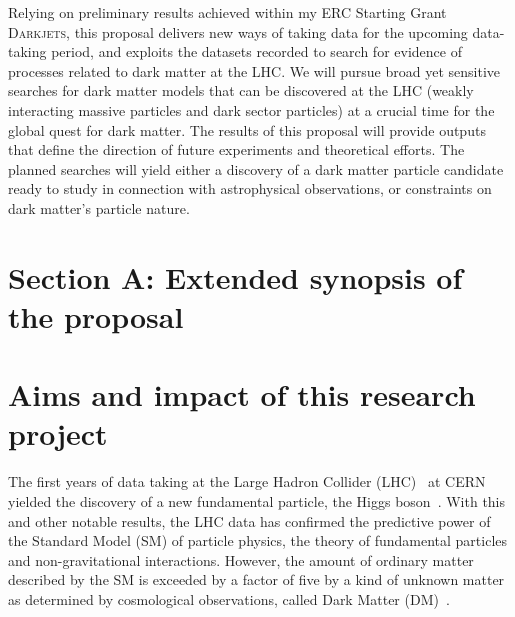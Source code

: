 \documentclass[11pt,a4paper]{article}
\begin{document}
Relying on preliminary results achieved within my ERC Starting Grant \textsc{Darkjets}, this proposal delivers new ways of taking data for the upcoming data-taking period, and exploits the datasets recorded to search for evidence of processes related to dark matter at the LHC. 
We will pursue broad yet sensitive searches for dark matter models that can be discovered at the LHC (weakly interacting massive particles and dark sector particles) at a crucial time for the global quest for dark matter. 
The results of this proposal will provide outputs that define the direction of future experiments and theoretical efforts. The planned searches will yield either a discovery of a dark matter particle candidate ready to study in connection with astrophysical observations, or constraints on dark matter’s particle nature. 

\clearpage

\section*{Section A: Extended synopsis of the proposal} 

\medskip

\section{Aims and impact of this research project} 
\smallskip

The first years of data taking at the Large Hadron Collider (LHC)~\cite{LHC2008} at CERN yielded the discovery of a new fundamental particle, the Higgs boson~\cite{Khachatryan:2016vau}. With this and other notable results, the LHC data has confirmed the predictive power of the Standard Model (SM) of particle physics, the theory of fundamental particles and non-gravitational interactions. However, the amount of ordinary matter described by the SM is exceeded by a factor of five by a kind of unknown matter as determined by cosmological observations, called Dark Matter (DM)~\cite{Bertone:2016nfn}. 

\end{document}
